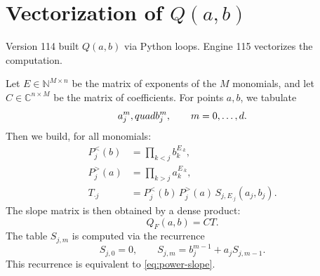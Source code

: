 \documentclass[11pt,a4paper]{article}
\begin{document}
\section{Vectorization of \(Q(a,b)\)}
Version 114 built \(Q(a,b)\) via Python loops. Engine 115 vectorizes the computation.

Let \(E\in\mathbb N^{M\times n}\) be the matrix of exponents of the \(M\) monomials, and let \(C\in\mathbb C^{n\times M}\) be the matrix of coefficients. For points \(a,b\), we tabulate
\[
  a_j^m,\\quad b_j^m,\qquad m=0,\ldots,d.
\]
Then we build, for all monomials:
\begin{align}
  P_j^{<}(b) &= \prod_{k<j} b_k^{E_{\cdot k}},\\
  P_j^{>}(a) &= \prod_{k>j} a_k^{E_{\cdot k}},\\
  T_{\cdot j} &= P_j^{<}(b)\,P_j^{>}(a)\,S_{j,E_{\cdot j}}(a_j,b_j).
\end{align}
The slope matrix is then obtained by a dense product:
\begin{equation}
  Q_F(a,b)=C T.
  \label{eq:gemm-slope}
\end{equation}
The table \(S_{j,m}\) is computed via the recurrence
\begin{equation}
  S_{j,0}=0,\qquad S_{j,m}=b_j^{m-1}+a_jS_{j,m-1}.
  \label{eq:slope-recursion}
\end{equation}
This recurrence is equivalent to \eqref{eq:power-slope}.
\end{document}
